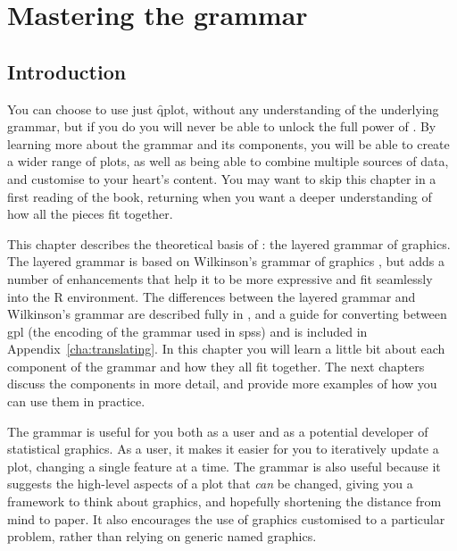 

% 


\chapter{Mastering the grammar}
\label{cha:mastery}

\section{Introduction}

You can choose to use just \f{qplot}, without any understanding of the underlying grammar, but if you do you will never be able to unlock the full power of \ggplot.  By learning more about the grammar and its components, you will be able to create a wider range of plots, as well as being able to combine multiple sources of data, and customise to your heart's content.  You may want to skip this chapter in a first reading of the book, returning when you want a deeper understanding of how all the pieces fit together.

This chapter describes the theoretical basis of \ggplot: the layered grammar of graphics.  The layered grammar is based on Wilkinson's grammar of graphics \citep{wilkinson:2006}, but adds a number of enhancements that help it to be more expressive and fit seamlessly into the R environment.  The differences between the layered grammar and Wilkinson's grammar are described fully in \citep{wickham:2008}, and a guide for converting between {\sc gpl} (the encoding of the grammar used in {\sc spss}) and \ggplot is included in Appendix~\ref{cha:translating}.  In this chapter you will learn a little bit about each component of the grammar and how they all fit together.  The next chapters discuss the components in more detail, and provide more examples of how you can use them in practice.

The grammar is useful for you both as a user and as a potential developer of statistical graphics.  As a user, it makes it easier for you to iteratively update a plot, changing a single feature at a time.  The grammar is also useful because it suggests the high-level aspects of a plot that \emph{can} be changed, giving you a framework to think about graphics, and hopefully shortening the distance from mind to paper.  It also encourages the use of graphics customised to a particular problem, rather than relying on generic named graphics.

